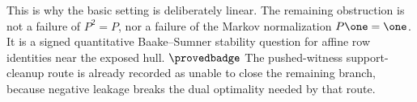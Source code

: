 This is why the basic setting is deliberately linear.  The remaining
obstruction is not a failure of \(P^2=P\), nor a failure of the Markov
normalization \(P\one=\one\).  It is a signed quantitative
Baake--Sumner stability question for affine row identities near the
exposed hull.  \(\provedbadge\) The pushed-witness support-cleanup route
is already recorded as unable to close the remaining branch, because
negative leakage breaks the dual optimality needed by that route.
